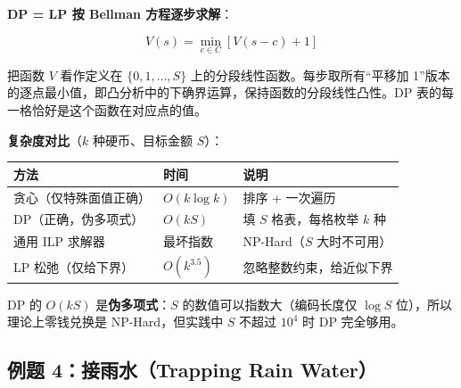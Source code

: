 \documentclass[12pt, a4paper]{ctexart}
\begin{document}
\begin{blackboard}
\textbf{DP = LP 按 Bellman 方程逐步求解}：

$$V(s) = \min_{c \in C} [V(s-c) + 1]$$

把函数 $V$ 看作定义在 $\{0,1,\ldots,S\}$ 上的分段线性函数。每步取所有``平移加 1''版本的逐点最小值，即凸分析中的下确界运算，保持函数的分段线性凸性。DP 表的每一格恰好是这个函数在对应点的值。

\textbf{复杂度对比}（$k$ 种硬币、目标金额 $S$）：

\begin{center}
\begin{tabular}{lll}
\toprule
方法 & 时间 & 说明 \\
\midrule
贪心（仅特殊面值正确） & $O(k\log k)$ & 排序 + 一次遍历 \\
DP（正确，伪多项式） & $O(kS)$ & 填 $S$ 格表，每格枚举 $k$ 种 \\
通用 ILP 求解器 & 最坏指数 & NP-Hard（$S$ 大时不可用） \\
LP 松弛（仅给下界） & $O(k^{3.5})$ & 忽略整数约束，给近似下界 \\
\bottomrule
\end{tabular}
\end{center}

DP 的 $O(kS)$ 是\textbf{伪多项式}：$S$ 的数值可以指数大（编码长度仅 $\log S$ 位），所以理论上零钱兑换是 NP-Hard，但实践中 $S$ 不超过 $10^4$ 时 DP 完全够用。

\end{blackboard}

\subsection{例题 4：接雨水（Trapping Rain Water）}
\end{document}
